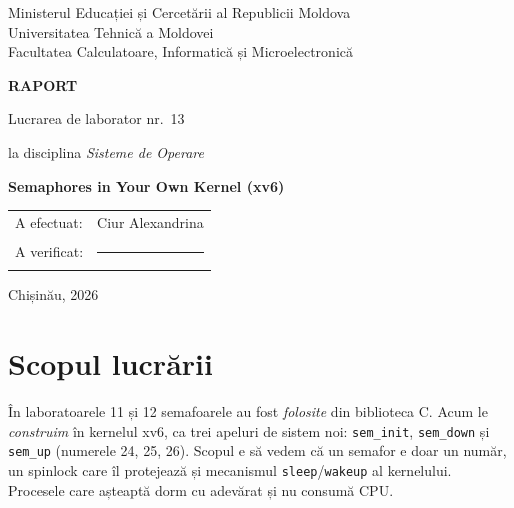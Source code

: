 \documentclass[11pt,a4paper]{article}
\begin{document}
\begin{titlepage}
\centering
{\large Ministerul Educației și Cercetării al Republicii Moldova\\
Universitatea Tehnică a Moldovei\\
Facultatea Calculatoare, Informatică și Microelectronică\par}
\vspace{5cm}
{\LARGE\bfseries RAPORT\par}
\vspace{0.6cm}
{\Large Lucrarea de laborator nr.~13\par}
\vspace{0.4cm}
{\large la disciplina \textit{Sisteme de Operare}\par}
\vspace{0.6cm}
{\Large\bfseries Semaphores in Your Own Kernel (xv6)\par}
\vfill
\begin{flushright}
\begin{tabular}{ll}
A efectuat: & Ciur Alexandrina \\
A verificat: & \rule{4.5cm}{0.4pt} \\
\end{tabular}
\end{flushright}
\vspace{2cm}
{\large Chișinău, 2026\par}
\end{titlepage}

\section*{Scopul lucrării}
În laboratoarele 11 și 12 semafoarele au fost \emph{folosite} din biblioteca C. Acum le \emph{construim} în kernelul xv6,
ca trei apeluri de sistem noi: \texttt{sem\_init}, \texttt{sem\_down} și \texttt{sem\_up} (numerele 24, 25, 26). Scopul e
să vedem că un semafor e doar un număr, un spinlock care îl protejează și mecanismul \texttt{sleep}/\texttt{wakeup} al
kernelului. Procesele care așteaptă dorm cu adevărat și nu consumă CPU.
\end{document}
